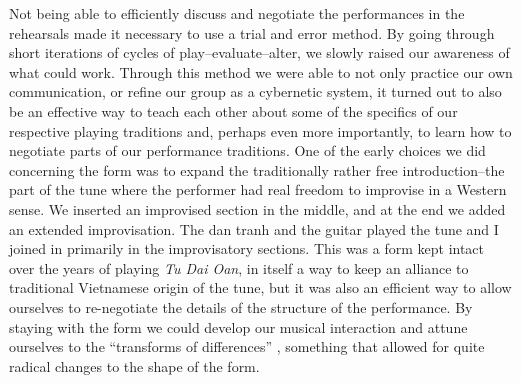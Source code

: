 \documentclass[a4paper]{article}
\begin{document}
Not being able to efficiently discuss and negotiate the performances in the rehearsals made it necessary to use a trial and error method. By going through short iterations of cycles of play--evaluate--alter, we slowly raised our awareness of what could work. Through this method we were able to not only practice our own communication, or refine our group as a cybernetic system, it turned out to also be an effective way to teach each other about some of the specifics of our respective playing traditions and, perhaps even more importantly, to learn how to negotiate parts of our performance traditions. One of the early choices we did concerning the form was to expand the traditionally rather free introduction--the part of the tune where the performer had real freedom to improvise in a Western sense. We inserted an improvised section in the middle, and at the end we added an extended improvisation. The dan tranh and the guitar played the tune and I joined in primarily in the improvisatory sections. This was a form kept intact over the years of playing \emph{Tu Dai Oan}, in itself a way to keep an alliance to traditional Vietnamese origin of the tune, but it was also an efficient way to allow ourselves to re-negotiate the details of the structure of the performance. By staying with the form we could develop our musical interaction and attune ourselves to the ``transforms of differences'' \citep[p. 318]{bateson72:steps}, something that allowed for quite radical changes to the shape of the form.
\end{document}
